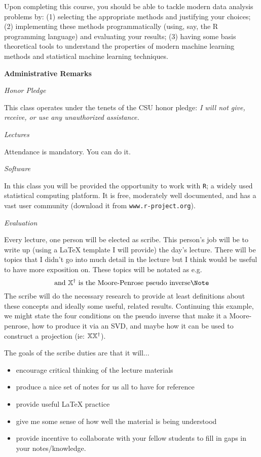 \documentclass[11pt]{article}
\begin{document}
Upon completing this course, you should be able to tackle modern data analysis problems
by: (1) selecting the appropriate methods and justifying your choices; (2) implementing
these methods programmatically (using, say, the R programming language) and evaluating
your results; (3) having some basis theoretical tools to understand the properties of modern 
machine learning methods and statistical machine learning techniques.


\vspace{.5in}

\newpage

\centerline{{\bf \Large Administrative Remarks}}

\vskip 13.2pt
\centerline{{\it Honor Pledge}} This class operates under the tenets of the CSU honor pledge:
{\it I will not give, receive, or use any unauthorized assistance.}

\vskip 13.2pt
\centerline{{\it Lectures}}
  Attendance is mandatory.  You can do it.

\vskip 13.2pt

\centerline{{\it Software}}

In this class you will be provided the opportunity to work with
{\tt R}; a widely used statistical computing platform.  It is free,
moderately well documented, and has a vast user community
(download it from {\tt www.r-project.org}).

\vskip 13.2pt

\centerline{{\it Evaluation}}

 Every lecture, one person will be elected as scribe.  This person's job will be to write up
(using a \LaTeX{} template I will provide) the day's lecture.  There will be topics that I didn't go into much detail
in the lecture but I think would be useful to have more exposition on.  These topics will be notated as e.g.
\[
\textrm{and $\X^{\dagger}$ is the Moore-Penrose pseudo inverse\Note}
\]
The scribe will do the necessary research to provide at least definitions about these concepts and
ideally some useful, related results.  Continuing this example, we might state the four conditions on the pseudo
inverse that make it a Moore-penrose, how to produce it via an SVD, and maybe how it can be used to construct
a projection (ie: $\mathbb{X} \mathbb{X}^{\dagger}$).

The goals of the scribe duties are that it will...
\begin{itemize}
\item encourage critical thinking of the lecture materials
\item produce a nice set of notes for us all to have for reference
\item provide useful \LaTeX{} practice
\item give me some sense of how well the material is being understood
\item provide incentive to collaborate with your fellow students to fill in gaps in your notes/knowledge.
\end{itemize}
\end{document}
